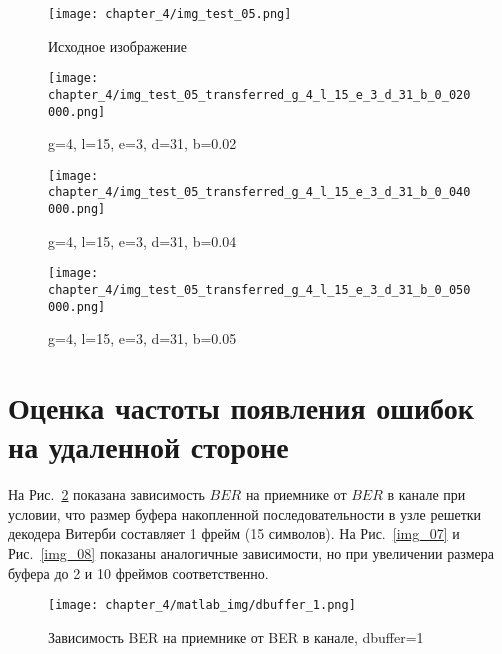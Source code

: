 \begin{figure}[h]
\begin{center}
\begin{minipage}[h]{0.4\linewidth}
\texttt{[image: chapter\_4/img\_test\_05.png]}
\caption{Исходное изображение}
\label{img:bmp_experimcoded1}
\end{minipage}
\hfill 
\begin{minipage}[h]{0.4\linewidth}
\texttt{[image: chapter\_4/img\_test\_05\_transferred\_g\_4\_l\_15\_e\_3\_d\_31\_b\_0\_020000.png]}
\caption{g=4, l=15, e=3, d=31, b=0.02}
\label{img:bmp_experimcoded2}
\end{minipage}
\end{center}

\begin{center}
\begin{minipage}[h]{0.4\linewidth}
\texttt{[image: chapter\_4/img\_test\_05\_transferred\_g\_4\_l\_15\_e\_3\_d\_31\_b\_0\_040000.png]}
\caption{g=4, l=15, e=3, d=31, b=0.04}
\label{img:bmp_experimcoded3}
\end{minipage}
\hfill 
\begin{minipage}[h]{0.4\linewidth}
\texttt{[image: chapter\_4/img\_test\_05\_transferred\_g\_4\_l\_15\_e\_3\_d\_31\_b\_0\_050000.png]}
\caption{g=4, l=15, e=3, d=31, b=0.05}
\label{img:bmp_experimcoded4}
\end{minipage}
\end{center}
\end{figure}

\section{Оценка частоты появления ошибок на удаленной стороне}
На Рис.~\ref{img_06} показана зависимость $BER$ на приемнике от $BER$ в канале при условии, что размер буфера накопленной
последовательности в узле решетки декодера Витерби составляет 1 фрейм (15 символов). На Рис.~\ref{img_07} и 
Рис.~\ref{img_08} показаны аналогичные зависимости, но при увеличении размера буфера до 2 и 10 фреймов соответственно.

\begin{figure}[h]
\begin{center}
\texttt{[image: chapter\_4/matlab\_img/dbuffer\_1.png]}
\caption{Зависимость BER на приемнике от BER в канале, dbuffer=1}
\label{img_06}
\end{center}
\end{figure}

